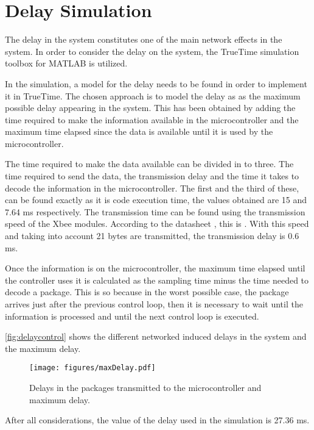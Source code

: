 \section{Delay Simulation}
The delay in the system constitutes one of the main network effects in the system. In order to consider the delay on the system, the TrueTime simulation toolbox for MATLAB is utilized. 

In the simulation, a model for the delay needs to be found in order to implement it in TrueTime. The chosen approach is to model the delay as as the maximum possible delay appearing in the system. This has been obtained by adding the time required to make the information available in the microcontroller and the maximum time elapsed since the data is available until it is used by the microcontroller. 

The time required to make the data available can be divided in to three. The time required to send the data, the transmission delay and the time it takes to decode the information in the microcontroller. The first and the third of these, can be found exactly as it is code execution time, the values obtained are 15 and 7.64 ms respectively. The transmission time can be found using the transmission speed of the Xbee modules. According to the datasheet , this is . With this speed and taking into account 21 bytes are transmitted, the transmission delay is 0.6 ms.

Once the information is on the microcontroller, the maximum time elapsed until the controller uses it is calculated as the sampling time minus the time needed to decode a package. This is so because in the worst possible case, the package arrives just after the previous control loop, then it is necessary to wait until the information is processed and until the next control loop is executed. 

\autoref{fig:delaycontrol} shows the different networked induced delays in the system and the maximum delay. 
\begin{figure}[H]
	\centering
	\texttt{[image: figures/maxDelay.pdf]}
	\caption{Delays in the packages transmitted to the microcontroller and maximum delay.}
	\label{fig:delaycontrol}
\end{figure}

After all considerations, the value of the delay used in the simulation is 27.36 ms.

